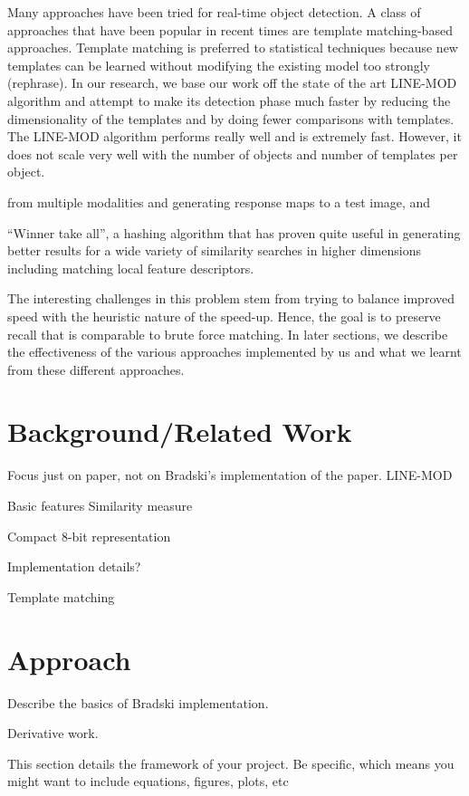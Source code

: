 \documentclass[10pt,twocolumn,letterpaper]{article}
\begin{document}
Many approaches have been tried for real-time object detection. A class of approaches that have been popular in recent times are template matching-based approaches. Template matching is preferred to statistical techniques because new templates can be learned without modifying the existing model too strongly (rephrase). In our research, we base our work off the state of the art LINE-MOD algorithm and attempt to make its detection phase much faster by reducing the dimensionality of the templates and by doing fewer comparisons with templates. The LINE-MOD algorithm performs really well and is extremely fast. However, it does not scale very well with the number of objects and number of templates per object.

 from multiple modalities and generating response maps to a test image, and 

“Winner take all”, a hashing algorithm that has proven quite useful in generating better results for a wide variety of similarity searches in higher dimensions including matching local feature descriptors.

The interesting challenges in this problem stem from trying to balance improved speed with the heuristic nature of the speed-up. Hence, the goal is to preserve recall that is comparable to brute force matching. In later sections, we describe the effectiveness of the various approaches implemented by us and what we learnt from these different approaches.

\section{Background/Related Work}

Focus just on paper, not on Bradski's implementation of the paper.
LINE-MOD

Basic features
Similarity measure

Compact 8-bit representation

Implementation details?

Template matching 

\section{Approach}

Describe the basics of Bradski implementation.

Derivative work.

This section details the framework of your project. Be specific, which means you might want to include equations, figures, plots, etc
\end{document}
